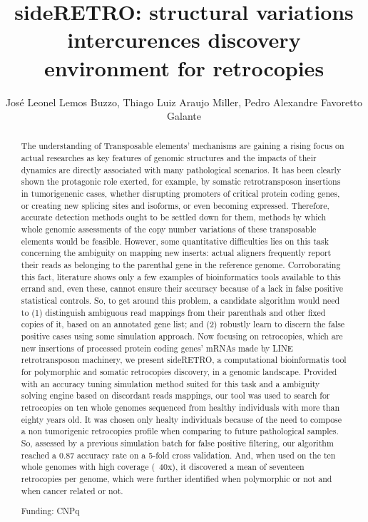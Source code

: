 \documentclass[twoside]{article}
\title{\vspace{-15mm}\fontsize{24pt}{10pt}\selectfont\textbf{ sideRETRO: structural variations intercurences discovery environment for retrocopies }} %
\author{ Jos\'e Leonel Lemos Buzzo, Thiago Luiz Araujo Miller, Pedro Alexandre Favoretto Galante }
\affil{ USP }
\date{}
\begin{document}
  
  
  \maketitle %
  
  
  \thispagestyle{fancy} %
  
  
  \begin{abstract}
  The understanding of Transposable elements' mechanisms are gaining a rising focus on actual researches as key features of genomic structures and the impacts of their dynamics are directly associated with many pathological scenarios. 	It has been clearly shown the protagonic role exerted,  for example,  by somatic retrotransposon insertions in tumorigenenic cases,  whether disrupting promoters of critical protein coding genes,  or creating new splicing sites and isoforms,  or even becoming expressed. 	Therefore,  accurate detection methods ought to be settled down for them,  methods by which whole genomic assessments of the copy number variations of these transposable elements would be feasible. However,  some quantitative difficulties lies on this task concerning the ambiguity on mapping new inserts: actual aligners frequently report their reads as belonging to the parenthal gene in the reference genome. Corroborating this fact,  literature shows only a few examples of bioinformatics tools available to this errand and,  even these,  cannot ensure their accuracy because of a lack in false positive statistical controls. So,  to get around this problem,  a candidate algorithm would need to (1) distinguish ambiguous read mappings from their parenthals and other fixed copies of it,  based on an annotated gene list; and (2) robustly learn to discern the false positive cases using some simulation approach. 	Now focusing on retrocopies,  which are new insertions of processed protein coding genes' mRNAs made by LINE retrotransposon machinery,  we present sideRETRO,  a computational bioinformatis tool for polymorphic and somatic retrocopies discovery,  in a genomic landscape. Provided with an accuracy tuning simulation method suited for this task and a ambiguity solving engine based on discordant reads mappings,  our tool was used to search for retrocopies on ten whole genomes sequenced from healthy individuals with more than eighty years old. It was chosen only healty individuals because of the need to compose a non tumorigenic retrocopies profile when comparing to future pathological samples.	So,  assessed by a previous simulation batch for false positive filtering,  our algorithm reached a 0.87 accuracy rate on a 5-fold cross validation. And,  when used on the ten whole genomes with high coverage (~40x),  it discovered a mean of seventeen retrocopies per genome,  which were further identified when polymorphic or not and when cancer related or not.
  
  Funding: CNPq \\ 
  \end{abstract}
  
\end{document}
